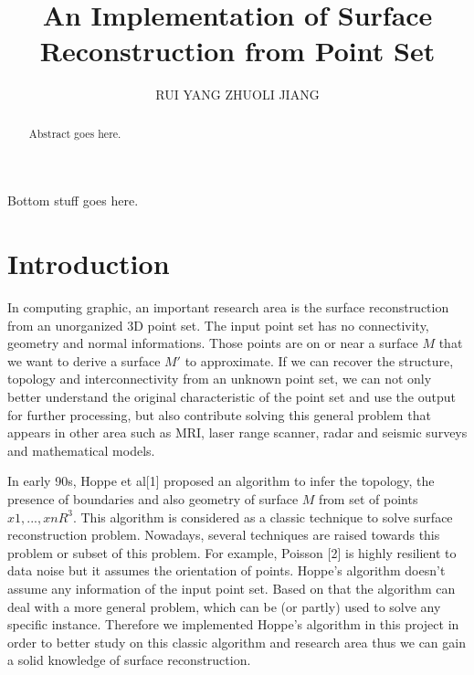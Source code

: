 \documentclass[acmcmpt, twoside]{acmsmall}
\begin{document}

\title{An Implementation of Surface Reconstruction from Point Set}
\author{RUI YANG
ZHUOLI JIANG
}

\begin{abstract}
Abstract goes here.
\end{abstract}


\begin{bottomstuff}
Bottom stuff goes here.
\end{bottomstuff}

\maketitle

\section{Introduction}
In computing graphic, an important research area is the surface reconstruction from an unorganized 3D point set. The input point set has no connectivity, geometry and normal informations. Those points are on or near a surface $M$ that we want to derive a surface $M\prime$ to approximate. If we can recover the structure, topology and interconnectivity from an unknown point set, we can not only better understand the original characteristic of the point set and use the output for further processing, but also contribute solving this general problem that appears in other area such as MRI, laser range scanner, radar and seismic surveys and mathematical models.
 
In early 90s, Hoppe et al[1] proposed an algorithm to infer the topology, the presence of boundaries and also geometry of surface $M$ from set of points ${x1,...,xn} R^3$. This algorithm is considered as a classic technique to solve surface reconstruction problem. Nowadays, several techniques are raised towards this problem or subset of this problem. For example, Poisson [2] is highly resilient to data noise but it assumes the orientation of points. Hoppe's algorithm doesn't assume any information of the input point set. Based on that the algorithm can deal with a more general problem, which can be (or partly) used to solve any specific instance. Therefore we implemented Hoppe's algorithm in this project in order to better study on this classic algorithm and research area thus we can gain a solid knowledge of surface reconstruction.
\end{document}
